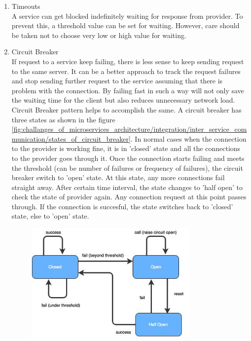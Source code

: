 \begin{enumerate}
\item Timeouts \\ A service can get blocked indefinitely waiting for response from provider. To prevent this, a threshold value can be set for waiting. However, care should be taken not to choose very low or high value for waiting. 
\item Circuit Breaker \\ If request to a service keep failing, there is less sense to keep sending request to the same server. It can be a better approach to track the request failures and stop sending further request to the service assuming that there is problem with the connection. By failing fast in such a way will not only save the waiting time for the client but also reduces unnecessary network load. Circuit Breaker pattern helps to accomplish the same. A circuit breaker has three states as shown in the figure \ref{fig:challanges_of_microservices_architecture/integration/inter_service_communication/states_of_circuit_breaker}. In normal cases when the connection to the provider is working fine, it is in 'closed' state and all the connections to the provider goes through it. Once the connection starts failing and meets the threshold (can be number of failures or frequency of failures), the circuit breaker switch to 'open' state. At this state, any more connections fail straight away. After certain time interval, the state changes to 'half open' to check the state of provider again. Any connection request at this point passes through. If the connection is succesful, the state switches back to 'closed' state, else to 'open' state.\cite{Fowler:2014ac} \cite{Newman:2015aa} \cite{Nygard:2007aa}
\begin{figure}[H]
\begin{center}
\includegraphics[width=0.8\textwidth]{figures/challanges_three_circuit_breaker}

\end{center}
\end{figure}
\end{enumerate}
